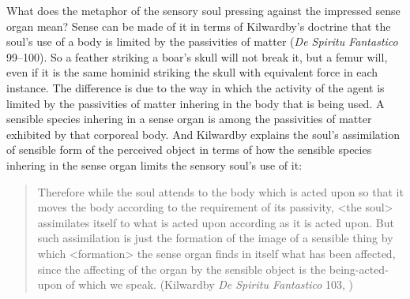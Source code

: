 What does the metaphor of the sensory soul pressing against the impressed sense organ mean? Sense can be made of it in terms of Kilwardby's doctrine that the soul's use of a body is limited by the passivities of matter (\emph{De Spiritu Fantastico} 99--100). So a feather striking a boar's skull will not break it, but a femur will, even if it is the same hominid striking the skull with equivalent force in each instance. The difference is due to the way in which the activity of the agent is limited by the passivities of matter inhering in the body that is being used. A sensible species inhering in a sense organ is among the passivities of matter exhibited by that corporeal body. And Kilwardby explains the soul's assimilation of sensible form of the perceived object in terms of how the sensible species inhering in the sense organ limits the sensory soul's use of it:
\begin{quote}
	Therefore while the soul attends to the body which is acted upon so that it moves the body according to the requirement of its passivity, <the soul> assimilates itself to what is acted upon according as it is acted upon. But such assimilation is just the formation of the image of a sensible thing by which <formation> the sense organ finds in itself what has been affected, since the affecting of the organ by the sensible object is the being-acted-upon of which we speak. (Kilwardby \emph{De Spiritu Fantastico} 103, \citealt[94]{Broadie:1993dz})
\end{quote}

